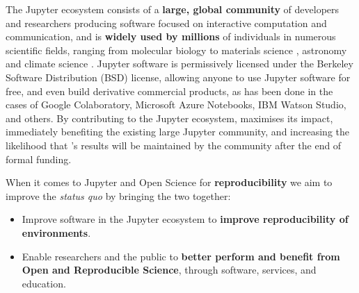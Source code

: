 The Jupyter ecosystem consists of a \textbf{large, global community} of
developers and researchers producing software focused on interactive
computation and communication, and is \textbf{widely used by millions} of
individuals in numerous scientific fields, ranging from molecular
biology \cite{Wang2016} to materials science \cite{Hughes2014},
astronomy \cite{Baron2017} and climate science
\cite{Laken2015,Laken2015b}.  Jupyter software is permissively
licensed under the Berkeley Software Distribution (BSD) license,
allowing anyone to use Jupyter software for free, and even build
derivative commercial products, as has been done in the cases of
Google Colaboratory, Microsoft Azure Notebooks, IBM Watson Studio, and
others.  By contributing to the Jupyter ecosystem,
\TheProject maximises its impact, immediately benefiting the existing
large Jupyter community, and increasing the likelihood that
\TheProject's results will be maintained by the community after the
end of formal funding.

When it comes to Jupyter and Open Science for \textbf{reproducibility} we aim to improve the
\textit{status quo} by bringing the two together:

\begin{itemize}
\item Improve software in the Jupyter ecosystem to \textbf{improve reproducibility of environments}.
\item Enable researchers and the public to \textbf{better perform and benefit
  from Open and Reproducible Science}, through software, services, and education.
\end{itemize}


